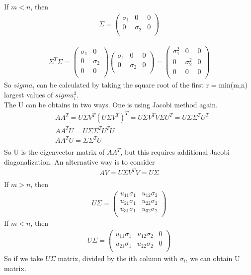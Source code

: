 \documentclass[a4paper]{article}
\begin{document}
If $m < n $, then\\
\begin{align*}
	\Sigma = \left(  \begin{array} {ccc }
		\sigma_1 & 0 & 0\\
		0 & \sigma_2 & 0\\
	\end{array} \right)
\end{align*}

\begin{align*}
	\Sigma^T \Sigma = \left(  \begin{array} {cc}
		\sigma_1 & 0  \\
		0 & \sigma_2 \\
		0 & 0\\
	\end{array} \right)
	\left(  \begin{array} {ccc}
		\sigma_1 & 0 & 0\\
		0 & \sigma_2 & 0\\
	\end{array} \right)
	= \left(  \begin{array} {ccc}
		\sigma_1^2 & 0 & 0\\
		0 & \sigma_2^2 & 0\\
		0 & 0 & 0\\
	\end{array} \right)
\end{align*}
So $sigma_i$ can be calculated by taking the square root of the first r = min(m,n) largest values of $sigma_i^2$.\\
The U can be obtains in two ways. One is using Jacobi method again.
\begin{align*}
	& A A^T =  U \Sigma V^T (U \Sigma V^T)^T = U \Sigma V^T V \Sigma U^T = U \Sigma \Sigma^T U^T \\
	& A A^T U =  U \Sigma \Sigma^T U^T U \\
	& A A^T U =  \Sigma \Sigma^T U \\
\end{align*}
So U is the eigenvector matrix of $A A^T$, but this requires additional Jacobi diagonalization. An alternative way is to consider\\
\begin{align*}
	AV = U \Sigma V^T V = U \Sigma\\
\end{align*}
If $m > n $, then\\
\begin{align*}
	U\Sigma = \left(  \begin{array} {cc}
		u_{11}\sigma_1 & u_{12}\sigma_2 \\
		u_{21}\sigma_1 & u_{22}\sigma_2 \\
		u_{31}\sigma_1 & u_{32}\sigma_2 \\
	\end{array} \right)
\end{align*}	
If $m < n $, then\\
\begin{align*}
	U\Sigma = \left(  \begin{array} {ccc}
		u_{11}\sigma_1 & u_{12}\sigma_2 & 0\\
		u_{21}\sigma_1 & u_{22}\sigma_2 & 0\\
	\end{array} \right)
\end{align*}
So if we take $U\Sigma$ matrix, divided by the ith column with $\sigma_i$, we can obtain U matrix.\\
\end{document}
